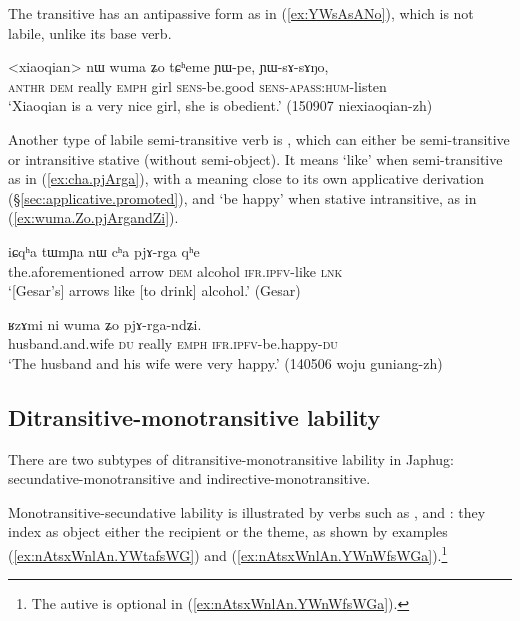 The transitive  has an antipassive form 	 as in (\ref{ex:YWsAsANo}), which is not labile, unlike its base verb.

\begin{exe}
\ex \label{ex:YWsAsANo}
\gll <xiaoqian> nɯ wuma ʑo tɕʰeme ɲɯ-pe, ɲɯ-sɤ-sɤŋo,  \\
\textsc{anthr} \textsc{dem} really \textsc{emph} girl \textsc{sens}-be.good \textsc{sens}-\textsc{apass}:\textsc{hum}-listen \\
\glt `Xiaoqian is a very nice girl, she is obedient.' (150907 niexiaoqian-zh) 
\end{exe}  

Another type of labile semi-transitive verb is , which can either be semi-transitive or intransitive stative (without semi-object). It means `like' when semi-transitive as in (\ref{ex:cha.pjArga}), with a meaning close to its own applicative derivation (§\ref{sec:applicative.promoted}), and `be happy' when stative intransitive, as in (\ref{ex:wuma.Zo.pjArgandZi}).

\begin{exe}
\ex \label{ex:cha.pjArga}
\gll iɕqʰa tɯmɲa nɯ cʰa pjɤ-rga qʰe \\
the.aforementioned arrow \textsc{dem} alcohol \textsc{ifr}.\textsc{ipfv}-like \textsc{lnk} \\
\glt `[Gesar's] arrows like [to drink] alcohol.' (Gesar)
\end{exe}

\begin{exe}
\ex \label{ex:wuma.Zo.pjArgandZi}
\gll ʁzɤmi ni wuma ʑo pjɤ-rga-ndʑi. \\
husband.and.wife \textsc{du} really \textsc{emph} \textsc{ifr}.\textsc{ipfv}-be.happy-\textsc{du} \\
\glt `The husband and his wife were very happy.' (140506 woju guniang-zh)
\end{exe}

 \subsection{Ditransitive-monotransitive lability} \label{sec:secundative.monotransitive}
There are two subtypes of ditransitive-monotransitive lability in Japhug: secun\-da\-tive-monotransitive and indirective-monotransitive.

Monotransitive-secundative lability is illustrated by verbs such as ,  and : they index as object either the recipient or the theme, as shown by examples (\ref{ex:nAtsxWnlAn.YWtafsWG}) and (\ref{ex:nAtsxWnlAn.YWnWfsWGa}).\footnote{The autive is optional in (\ref{ex:nAtsxWnlAn.YWnWfsWGa}). }

